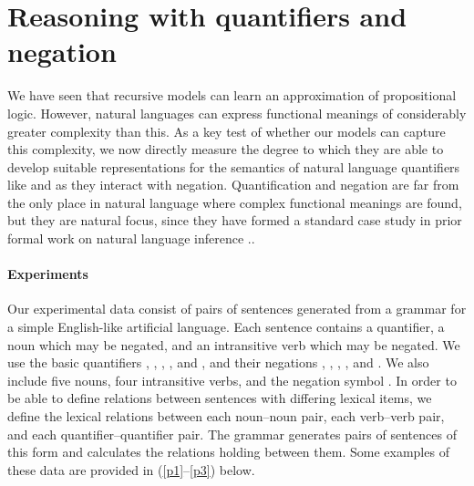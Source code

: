 \section{Reasoning with quantifiers and negation}\label{sec:quantifiers}

We have seen that recursive models can learn an approximation of propositional
logic.  However, natural languages can express functional meanings of
considerably greater complexity than this.  As a key test of whether our models 
can capture this complexity, we now directly measure the degree to which they are able to
develop suitable representations for the semantics of natural language
quantifiers like  and  as they interact with negation. Quantification 
and negation are far from the only place in natural language where complex functional meanings
are found, but they are natural focus, since they have
formed a standard case study in prior formal work on natural
language inference \cite{Icard:Moss:2013:LILT}..

\paragraph{Experiments}
Our experimental data consist of pairs of sentences generated
from a grammar for a simple English-like artificial language.
Each sentence contains a quantifier, a noun
which may be negated, and an intransitive verb which may be
negated. We use the basic quantifiers , , ,
, and , and their negations , ,
, , and . We also
include five nouns, four intransitive verbs, and the negation symbol
. In order to be able to define relations between sentences
with differing lexical items, we define the lexical relations between
each noun--noun pair, each verb--verb pair, and each
quantifier--quantifier pair. The grammar generates pairs of
sentences of this form and calculates the relations holding
between them.  Some examples of these data are provided in (\ref{p1}--\ref{p3}) below.



